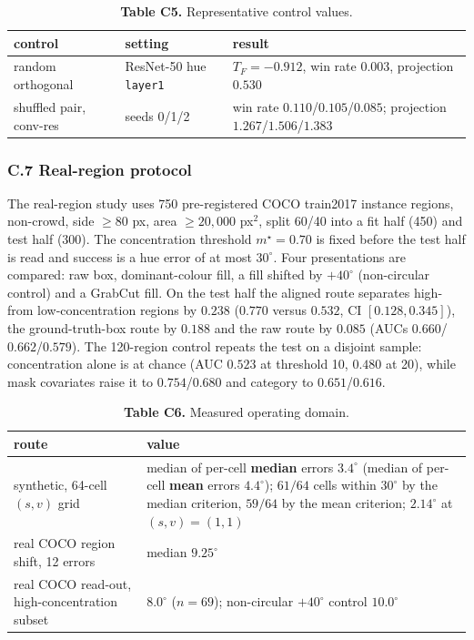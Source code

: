 \begin{table}[t]
\centering
\small
\caption*{\textbf{Table C5.} Representative control values.}
\begin{tabularx}{\textwidth}{@{}>{\raggedright\arraybackslash}X >{\raggedright\arraybackslash}X >{\raggedright\arraybackslash}X@{}}
\toprule
\textbf{control} & \textbf{setting} & \textbf{result} \\
\midrule
random orthogonal & ResNet-50 hue \texttt{layer1} & $T_F=-0.912$, win rate $0.003$, projection $0.530$ \\
shuffled pair, conv-res & seeds 0/1/2 & win rate $0.110$/$0.105$/$0.085$; projection $1.267$/$1.506$/$1.383$ \\
\bottomrule
\end{tabularx}
\end{table}

\subsubsection*{C.7 Real-region protocol}

The real-region study uses 750 pre-registered COCO train2017 instance regions, non-crowd, side $\ge80$ px, area $\ge20{,}000$ px$^2$, split 60/40 into a fit half (450) and test half (300). The concentration threshold $m^\star=0.70$ is fixed before the test half is read and success is a hue error of at most $30^\circ$. Four presentations are compared: raw box, dominant-colour fill, a fill shifted by $+40^\circ$ (non-circular control) and a GrabCut fill. On the test half the aligned route separates high- from low-concentration regions by $0.238$ ($0.770$ versus $0.532$, CI $[0.128,0.345]$), the ground-truth-box route by $0.188$ and the raw route by $0.085$ (AUCs $0.660$/$0.662$/$0.579$). The 120-region control repeats the test on a disjoint sample: concentration alone is at chance (AUC $0.523$ at threshold 10, $0.480$ at 20), while mask covariates raise it to $0.754$/$0.680$ and category to $0.651$/$0.616$.


\begin{table}[t]
\centering
\small
\caption*{\textbf{Table C6.} Measured operating domain.}
\begin{tabularx}{\textwidth}{@{}>{\raggedright\arraybackslash}X >{\raggedright\arraybackslash}X@{}}
\toprule
\textbf{route} & \textbf{value} \\
\midrule
synthetic, 64-cell $(s,\allowbreak{}v)$ grid & median of per-cell \textbf{median} errors $3.4^\circ$ (median of per-cell \textbf{mean} errors $4.4^\circ$); $61/64$ cells within $30^\circ$ by the median criterion, $59/64$ by the mean criterion; $2.14^\circ$ at $(s,\allowbreak{}v)=(1,\allowbreak{}1)$ \\
real COCO region shift, 12 errors & median $9.25^\circ$ \\
real COCO read-out, high-concentration subset & $8.0^\circ$ ($n=69$); non-circular $+40^\circ$ control $10.0^\circ$ \\
\bottomrule
\end{tabularx}
\end{table}


